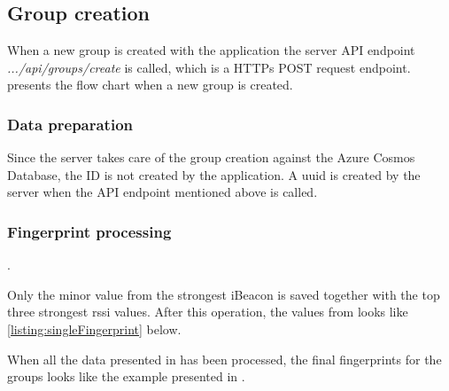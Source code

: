 \subsection{Group creation}\label{sec:implServerGroupCreation}
When a new group is created with the application the server API endpoint \textit{.../api/groups/create} is called, which is a HTTPs POST request endpoint.
 presents the flow chart when a new group is created.



\subsubsection{Data preparation}\label{sec:implServerGroupCreationDataPrep}
Since the server takes care of the group creation against the Azure Cosmos Database, the ID is not created by the application.
A \acrfull{uuid} is created by the server when the API endpoint mentioned above is called.


\subsubsection{Fingerprint processing}\label{sec:implServerGroupCreationFingerprint}
.


Only the minor value from the strongest iBeacon is saved together with the top three strongest \acrshort{rssi} values. After this operation, the values from  looks like \cref{listing:singleFingerprint} below.


When all the data presented in   has been processed, the final fingerprints for the groups looks like the example presented in .

